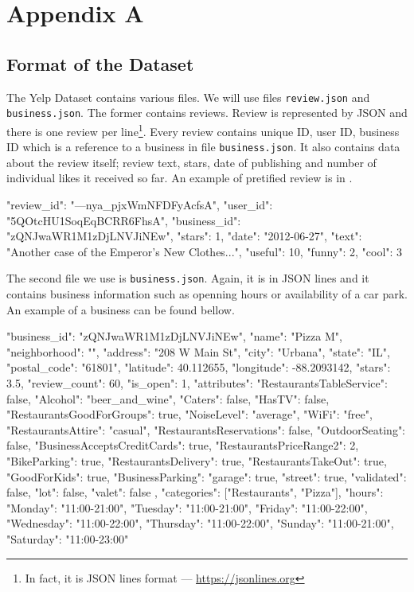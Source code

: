 \chapter*{Appendix A}
\label{app:a}


\section{Format of the Dataset}

The Yelp Dataset contains various files.
We will use files \texttt{review.json} and \texttt{business.json}.
The former contains reviews.
Review is represented by JSON and there is one review per line\footnote{In fact, it is JSON lines format --- \url{https://jsonlines.org}}.
Every review contains unique ID, user ID, business ID which is a reference to a business in file \texttt{business.json}.
It also contains data about the review itself; review text, stars, date of publishing and number of individual likes it received so far.
An example of pretified review is in .

\begin{code}
{
	"review_id": "---nya_pjxWmNFDFyAcfsA",
	"user_id": "5QOtcHU1SoqEqBCRR6FhsA",
	"business_id": "zQNJwaWR1M1zDjLNVJiNEw",
	"stars": 1,
	"date": "2012-06-27",
	"text": "Another case of the Emperor's New Clothes...",
	"useful": 10,
	"funny": 2,
	"cool": 3
}
\end{code}

The second file we use is \texttt{business.json}.
Again, it is in JSON lines and it contains business information such as openning hours or availability of a car park.
An example of a business can be found bellow.

\begin{code}
{
	"business_id": "zQNJwaWR1M1zDjLNVJiNEw",
	"name": "Pizza M",
	"neighborhood": "",
	"address": "208 W Main St",
	"city": "Urbana",
	"state": "IL",
	"postal_code": "61801",
	"latitude": 40.112655,
	"longitude": -88.2093142,
	"stars": 3.5,
	"review_count": 60,
	"is_open": 1,
	"attributes": {
		"RestaurantsTableService": false,
		"Alcohol": "beer_and_wine",
		"Caters": false,
		"HasTV": false,
		"RestaurantsGoodForGroups": true,
		"NoiseLevel": "average",
		"WiFi": "free",
		"RestaurantsAttire": "casual",
		"RestaurantsReservations": false,
		"OutdoorSeating": false,
		"BusinessAcceptsCreditCards": true,
		"RestaurantsPriceRange2": 2,
		"BikeParking": true,
		"RestaurantsDelivery": true,
		"RestaurantsTakeOut": true,
		"GoodForKids": true,
		"BusinessParking": {
			"garage": true,
			"street": true,
			"validated": false,
			"lot": false,
			"valet": false
		}
	},
	"categories": ["Restaurants", "Pizza"],
	"hours": {
		"Monday": "11:00-21:00",
		"Tuesday": "11:00-21:00",
		"Friday": "11:00-22:00",
		"Wednesday": "11:00-22:00",
		"Thursday": "11:00-22:00",
		"Sunday": "11:00-21:00",
		"Saturday": "11:00-23:00"
	}
}
\end{code}

